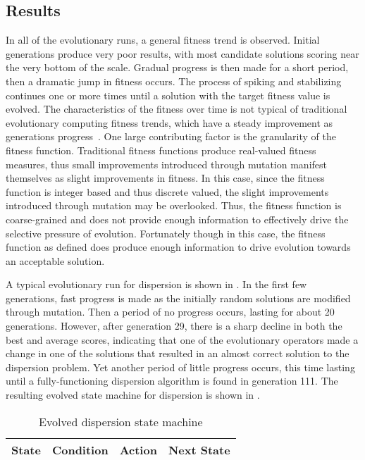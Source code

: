 \subsection{Results}

In all of the evolutionary runs, a general fitness trend is observed.  Initial generations produce very poor results, with most candidate solutions scoring near the very bottom of the scale.  Gradual progress is then made for a short period, then a dramatic jump in fitness occurs.  The process of spiking and stabilizing continues one or more times until a solution with the target fitness value is evolved.  The characteristics of the fitness over time is not typical of traditional evolutionary computing fitness trends, which have a steady improvement as generations progress~\cite{back:ec1}.  One large contributing factor is the granularity of the fitness function.  Traditional fitness functions produce real-valued fitness measures, thus small improvements introduced through mutation manifest themselves as slight improvements in fitness.  In this case, since the fitness function is integer based and thus discrete valued, the slight improvements introduced through mutation may be overlooked.  Thus, the fitness function is coarse-grained and does not provide enough information to effectively drive the selective pressure of evolution.  Fortunately though in this case, the fitness function as defined does produce enough information to drive evolution towards an acceptable solution.

A typical evolutionary run for dispersion is shown in .  In the first few generations, fast progress is made as the initially random solutions are modified through mutation.  Then a period of no progress occurs, lasting for about 20 generations.  However, after generation 29, there is a sharp decline in both the best and average scores, indicating that one of the evolutionary operators made a change in one of the solutions that resulted in an almost correct solution to the dispersion problem.  Yet another period of little progress occurs, this time lasting until a fully-functioning dispersion algorithm is found in generation 111.  The resulting evolved state machine for dispersion is shown in . 

\begin{table}[ht]
\centering
\caption{Evolved dispersion state machine}
\footnotesize
\begin{tabular}{|c|c|l|p{6ex}|}
  \hline
  State & Condition & Action & Next State \\
  \hline
  
\end{tabular}
\label{tab:DispersionAlgorithm}
\end{table}


